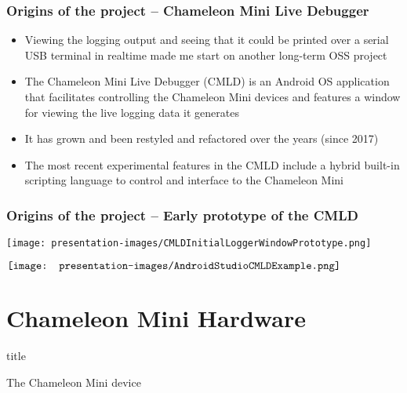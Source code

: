 \documentclass[usenames,svgnames,dvipsnames,11pt]{beamer}
\newcommand{\TitleBoxed}[1]{
     \begin{beamercolorbox}[sep=8pt,center,shadow=true,rounded=true]{title}
          \usebeamerfont{title}#1\par%
     \end{beamercolorbox}
}
\begin{document}
\begin{frame}
\frametitle{Origins of the project -- Chameleon Mini Live Debugger}

\begin{itemize}

\item Viewing the logging output and seeing that it could be printed over a serial USB terminal in realtime 
      made me start on another long-term OSS project 
\item The Chameleon Mini Live Debugger (CMLD) is an Android OS application that 
      facilitates controlling the Chameleon Mini devices and 
      features a window for viewing the live logging data it generates 
\item It has grown and been restyled and refactored over the years (since 2017)
\item The most recent experimental features in the CMLD include a hybrid built-in scripting language to 
      control and interface to the Chameleon Mini

\end{itemize}

\end{frame}

\begin{frame}
\frametitle{Origins of the project -- Early prototype of the CMLD}

\begin{center}
\texttt{[image: presentation-images/CMLDInitialLoggerWindowPrototype.png]}
\end{center}
\endminipage
{}
\begin{center}
$\vcenter{\hbox{\texttt{[image: presentation-images/AndroidStudioCMLDExample.png]}}}$
\end{center}
\endminipage

\end{frame}

\section{Chameleon Mini Hardware}

\begin{frame}
\TitleBoxed{
     \Huge{\centerline{The Chameleon Mini device}}
}
\end{frame}
\end{document}
